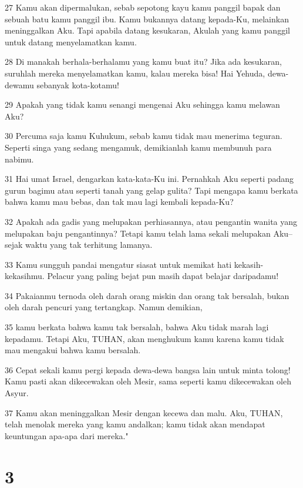 \par 27 Kamu akan dipermalukan, sebab sepotong kayu kamu panggil bapak dan sebuah batu kamu panggil ibu. Kamu bukannya datang kepada-Ku, melainkan meninggalkan Aku. Tapi apabila datang kesukaran, Akulah yang kamu panggil untuk datang menyelamatkan kamu.
\par 28 Di manakah berhala-berhalamu yang kamu buat itu? Jika ada kesukaran, suruhlah mereka menyelamatkan kamu, kalau mereka bisa! Hai Yehuda, dewa-dewamu sebanyak kota-kotamu!
\par 29 Apakah yang tidak kamu senangi mengenai Aku sehingga kamu melawan Aku?
\par 30 Percuma saja kamu Kuhukum, sebab kamu tidak mau menerima teguran. Seperti singa yang sedang mengamuk, demikianlah kamu membunuh para nabimu.
\par 31 Hai umat Israel, dengarkan kata-kata-Ku ini. Pernahkah Aku seperti padang gurun bagimu atau seperti tanah yang gelap gulita? Tapi mengapa kamu berkata bahwa kamu mau bebas, dan tak mau lagi kembali kepada-Ku?
\par 32 Apakah ada gadis yang melupakan perhiasannya, atau pengantin wanita yang melupakan baju pengantinnya? Tetapi kamu telah lama sekali melupakan Aku--sejak waktu yang tak terhitung lamanya.
\par 33 Kamu sungguh pandai mengatur siasat untuk memikat hati kekasih-kekasihmu. Pelacur yang paling bejat pun masih dapat belajar daripadamu!
\par 34 Pakaianmu ternoda oleh darah orang miskin dan orang tak bersalah, bukan oleh darah pencuri yang tertangkap. Namun demikian,
\par 35 kamu berkata bahwa kamu tak bersalah, bahwa Aku tidak marah lagi kepadamu. Tetapi Aku, TUHAN, akan menghukum kamu karena kamu tidak mau mengakui bahwa kamu bersalah.
\par 36 Cepat sekali kamu pergi kepada dewa-dewa bangsa lain untuk minta tolong! Kamu pasti akan dikecewakan oleh Mesir, sama seperti kamu dikecewakan oleh Asyur.
\par 37 Kamu akan meninggalkan Mesir dengan kecewa dan malu. Aku, TUHAN, telah menolak mereka yang kamu andalkan; kamu tidak akan mendapat keuntungan apa-apa dari mereka."

\chapter{3}

